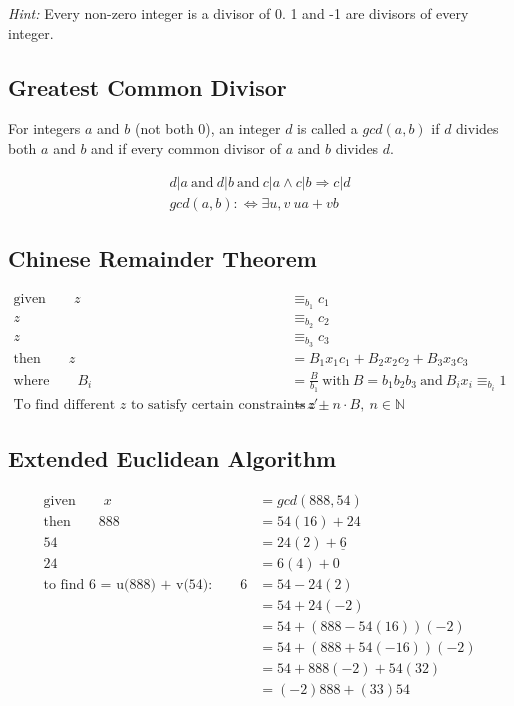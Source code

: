 \documentclass[11pt]{article}
\begin{document}
\emph{Hint:} Every non-zero integer is a divisor of 0. 1 and -1 are divisors of every integer.

\subsection{Greatest Common Divisor}

For integers $a$ and $b$ (not both 0), an integer $d$ is called a $gcd(a,b)$ if $d$ divides both $a$ and $b$ and if every common divisor of $a$ and $b$ divides $d$.

\begin{equation*}
\begin{split}
	d|a\ \text{and}\ d|b\ \text{and}\ c|a \land c|b \Rightarrow c|d \\
	gcd(a,b) :\Leftrightarrow \exists u,v\ ua + vb
\end{split}
\end{equation*}

\subsection{Chinese Remainder Theorem}

\begin{equation*}
\begin{split}
	\text{given}\qquad z & \equiv_{b_1} c_1 \\
	z & \equiv_{b_2} c_2 \\
	z & \equiv_{b_3} c_3 \\
	\text{then}\qquad z & = B_1x_1c_1 + B_2x_2c_2 + B_3x_3c_3 \\
	\text{where}\qquad B_i & = \frac{B}{b_1}\ \text{with}\ B = b_1b_2b_3\ \text{and}\ B_ix_i \equiv_{b_i} 1 \\
	\text{To find different $z$ to satisfy certain constraints}\qquad z' & = z \pm n \cdot B,\ n \in \mathbb{N}
\end{split}
\end{equation*}

\subsection{Extended Euclidean Algorithm}

\begin{equation*}
\begin{split}
	\text{given}\qquad x & = gcd(888, 54) \\
	\text{then}\qquad 888 & = 54(16) + 24 \\
	54 & = 24(2) + \underline{6} \\
	24 & = 6(4) + 0 \\
	\text{to find 6 = u(888) + v(54):}\qquad 6 & = 54 - 24(2) \\
	& = 54 + 24(-2) \\
	& = 54+ (888-54(16))(-2) \\
	& = 54 + (888+54(-16))(-2) \\
	& = 54 + 888(-2) + 54(32) \\
	& = (-2)888 + (33)54
\end{split}
\end{equation*}
\end{document}
